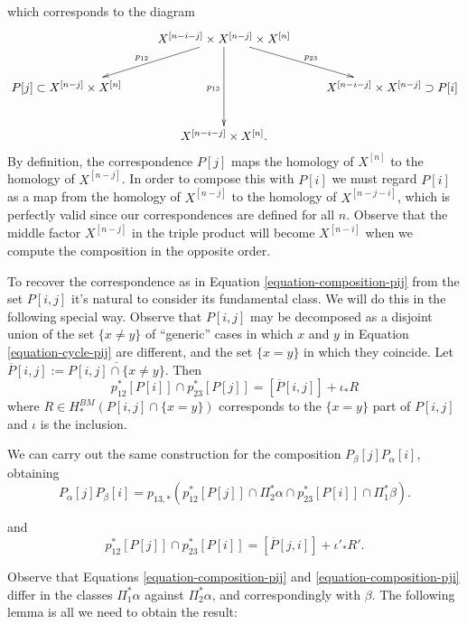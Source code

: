 \noindent
which corresponds to the diagram
$$
\xymatrix{
&  X^{[n-i-j]} \times X^{[n-j]} \times
X^{[n]}
\ar[dl]_{p_{12}}\ar[dr]^{p_{23}}\ar[dd]_{p_{13}}\\
P[j]\subset X^{[n-j]}\times X^{[n]}& &
X^{[n-i-j]}\times X^{[n-j]}\supset P[i]\\
& X^{[n-i-j]}\times X^{[n]}.
}
$$
By definition, the correspondence $P[j]$
maps the homology of $X^{[n]}$ to the
homology of $X^{[n-j]}$. In order to compose
this with $P[i]$
we must regard $P[i]$ as a map from the
homology of $X^{[n-j]}$
to the homology of $X^{[n-j-i]}$, which is
perfectly
valid since our correspondences are defined
for all $n$.
Observe that the middle factor $X^{[n-j]}$
in the triple product will become
$X^{[n-i]}$ when
we compute the composition in the opposite
order.

\medskip\noindent
To recover the correspondence as in
Equation \ref{equation-composition-pij}
from the set $P[i,j]$ it's natural to
consider its
fundamental class.
We will do this in the following special way.
Observe that $P[i,j]$ may be decomposed as a
disjoint union
of the set $\{x \neq y\}$
of ``generic'' cases in which $x$ and $y$ in
Equation \ref{equation-cycle-pij}
are different, and the set $\{x=y\}$ in
which they coincide.
Let
$\overline{P}[i,j]:=\overline{P[i,j]\cap\{x\neq y\}}$.
Then
$$
p_{12}^* [P[i]]\cap p_{23}^*
[P[j]]=[\overline{P}[i,j]]+\iota_*R
$$
where $R \in H_*^{BM}(P[i,j]\cap \{x=y\})$
corresponds
to the $\{x=y\}$ part of $P[i,j]$
and $\iota$ is the inclusion.

\medskip\noindent
We can carry out the same construction
for the composition $P_\beta[j]P_\alpha[i]$,
obtaining
\begin{equation}
\label{equation-composition-pji}
P_\alpha[j]P_\beta[i]
=p_{13,*}(p_{12}^*[P[j]]\cap\Pi_2^*\alpha\cap p_{23}^*[P[i]]\cap\Pi_1^*\beta).
\end{equation}

\noindent
and
\begin{equation}
\label{equation-pji-r}
p_{12}^* [P[j]]\cap p_{23}^*
[P[i]]=[\overline{P}[j,i]]+\iota'_*R'.
\end{equation}

\noindent
Observe that Equations
\ref{equation-composition-pij} and
\ref{equation-composition-pji} differ in the
classes
$\Pi_1^*\alpha$ against $\Pi_2^*\alpha$, and
correspondingly with $\beta$.
The following lemma is all we need to obtain
the result:

